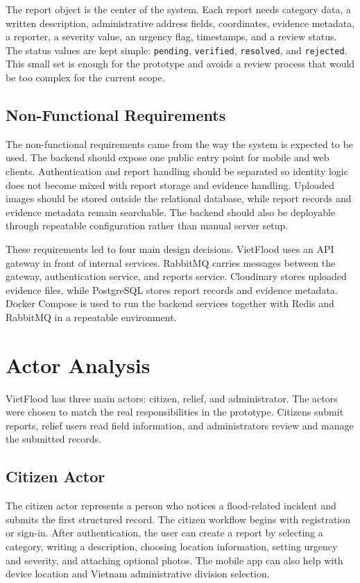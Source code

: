 The report object is the center of the system. Each report needs category data, a written description, administrative address fields, coordinates, evidence metadata, a reporter, a severity value, an urgency flag, timestamps, and a review status. The status values are kept simple: \texttt{pending}, \texttt{verified}, \texttt{resolved}, and \texttt{rejected}. This small set is enough for the prototype and avoids a review process that would be too complex for the current scope.

\subsection{Non-Functional Requirements}

The non-functional requirements came from the way the system is expected to be used. The backend should expose one public entry point for mobile and web clients. Authentication and report handling should be separated so identity logic does not become mixed with report storage and evidence handling. Uploaded images should be stored outside the relational database, while report records and evidence metadata remain searchable. The backend should also be deployable through repeatable configuration rather than manual server setup.

These requirements led to four main design decisions. VietFlood uses an API gateway in front of internal services. RabbitMQ carries messages between the gateway, authentication service, and reports service. Cloudinary stores uploaded evidence files, while PostgreSQL stores report records and evidence metadata. Docker Compose is used to run the backend services together with Redis and RabbitMQ in a repeatable environment.

\section{Actor Analysis}

VietFlood has three main actors: citizen, relief, and administrator. The actors were chosen to match the real responsibilities in the prototype. Citizens submit reports, relief users read field information, and administrators review and manage the submitted records.

\subsection{Citizen Actor}

The citizen actor represents a person who notices a flood-related incident and submits the first structured record. The citizen workflow begins with registration or sign-in. After authentication, the user can create a report by selecting a category, writing a description, choosing location information, setting urgency and severity, and attaching optional photos. The mobile app can also help with device location and Vietnam administrative division selection.

